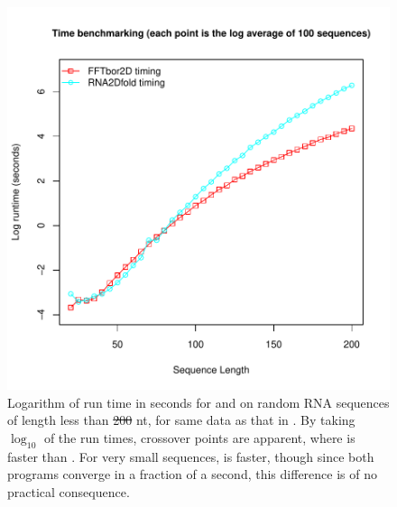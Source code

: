 \documentclass[11pt, oneside]{Thesis} %
\providecommand{\DIFadd}[1]{{\protect\color{blue}\uwave{#1}}} %
\providecommand{\DIFdel}[1]{{\protect\color{red}\sout{#1}}}                      %
\providecommand{\DIFaddFL}[1]{\DIFadd{#1}} %
\providecommand{\DIFdelFL}[1]{\DIFdel{#1}} %
\providecommand{\DIFaddbeginFL}{} %
\providecommand{\DIFaddendFL}{} %
\providecommand{\DIFdelbeginFL}{} %
\providecommand{\DIFdelendFL}{} %
\begin{document}
\begin{figure}[!ht]
\centering
\includegraphics[width=.9\textwidth]{Figures/FFTbor2D/ffttwoRtwofoldLogScale.pdf}
\DIFdelbeginFL %
\DIFdelendFL \DIFaddbeginFL \caption[Logarithm of run time in seconds for \rnatwofold and \ffttwo
on random RNA sequences of length less than $200$ nt]{\DIFaddendFL 
Logarithm of run time in seconds for \rnatwofold and \ffttwo
on random RNA sequences of length less than \DIFdelbeginFL \DIFdelFL{200 }\DIFdelendFL \DIFaddbeginFL \DIFaddFL{$200$ }\DIFaddendFL nt, for same data as that
in .
By taking $\log_{10}$ of the run times,
crossover points are apparent,
where \ffttwo is faster than \rnatwofold. For very small
sequences, \rnatwofold is faster, though since both programs converge
in a fraction of a second, this difference is of no practical consequence.
}
\label{fig:ffttwo:ffttwoRtwofoldLogScale}
\end{figure}
\end{document}
